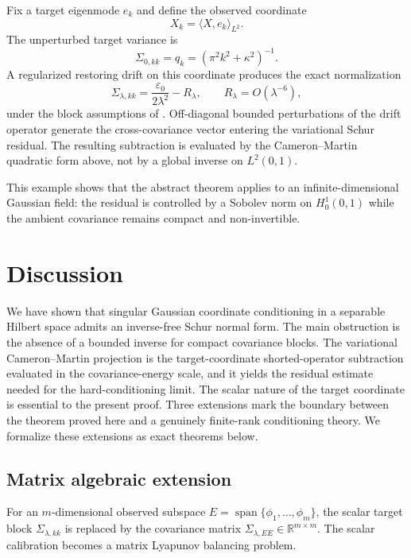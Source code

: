 \documentclass[11pt]{amsart}
\theoremstyle{plain}
\theoremstyle{definition}
\theoremstyle{remark}
\begin{document}
Fix a target eigenmode $e_k$ and define the observed coordinate
\[
  X_k=\langle X,e_k\rangle_{L^2}.
\]
The unperturbed target variance is
\[
  \Sigma_{0,kk}=q_k=(\pi^2k^2+\kappa^2)^{-1}.
\]
A regularized restoring drift on this coordinate produces the exact normalization
\[
  \Sigma_{\lambda,kk}=\frac{\varepsilon_0}{2\lambda^2}-R_\lambda,
  \qquad R_\lambda=O(\lambda^{-6}),
\]
under the block assumptions of . Off-diagonal bounded perturbations of the drift operator generate the cross-covariance vector entering the variational Schur residual. The resulting subtraction is evaluated by the Cameron--Martin quadratic form above, not by a global inverse on $L^2(0,1)$.

This example shows that the abstract theorem applies to an infinite-dimensional Gaussian field: the residual is controlled by a Sobolev norm on $H_0^1(0,1)$ while the ambient covariance remains compact and non-invertible.

\section{Discussion}
\label{sec:discussion}

We have shown that singular Gaussian coordinate conditioning in a separable Hilbert space admits an inverse-free Schur normal form.  The main obstruction is the absence of a bounded inverse for compact covariance blocks.  The variational Cameron--Martin projection is the target-coordinate shorted-operator subtraction evaluated in the covariance-energy scale, and it yields the residual estimate needed for the hard-conditioning limit.  The scalar nature of the target coordinate is essential to the present proof.  Three extensions mark the boundary between the theorem proved here and a genuinely finite-rank conditioning theory. We formalize these extensions as exact theorems below.

\subsection{Matrix algebraic extension}
\label{sec:discussion:matrix-extension}

For an $m$-dimensional observed subspace $E=\operatorname{span}\{\phi_1,\ldots,\phi_m\}$, the scalar target block $\Sigma_{\lambda,kk}$ is replaced by the covariance matrix $\Sigma_{\lambda,EE}\in\mathbb{R}^{m\times m}$. The scalar calibration becomes a matrix Lyapunov balancing problem.
\end{document}
